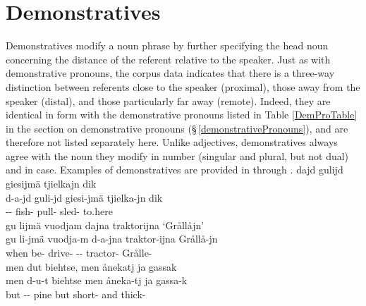 \section{Demonstratives}\label{demonstratives}
Demonstratives %
modify a noun phrase by further specifying the head noun concerning the distance of the referent relative to the speaker. Just as with demonstrative pronouns, the corpus data indicates that there is a three-way distinction between referents close to the speaker (proximal), those away from the speaker (distal), and those particularly far away (remote). 
Indeed, they are identical in form with the demonstrative pronouns listed in Table \vref{DemProTable} in the section on demonstrative pronouns (§\,\ref{demonstrativePronouns}), and are therefore not listed separately here. 
Unlike adjectives, demonstratives always agree with the noun they modify in number (singular and plural, but not dual) and in case. %
Examples of demonstratives %
are provided in  through .
\ea\label{demonstrativeAdjectivesEx1}
\glll	dajd gulijd giesijmä tjielkajn dik\\
	d-a-jd guli-jd giesi-jmä tjielka-jn dik\\
	-- fish- pull- sled- to.here\\\nopagebreak
{}	
\z
\ea\label{demonstrativeAdjectivesEx2}
\glll	gu lijmä vuodjam dajna traktorijna ‘Grållåjn’\\
	gu li-jmä vuodja-m d-a-jna traktor-ijna Grållå-jn\\
	when be- drive- -- tractor- Grålle-\\\nopagebreak
{}	
\z
\ea\label{demonstrativeAdjectivesEx3}
\glll	men dut biehtse, men ånekatj ja gassak\\
	men d-u-t biehtse men åneka-tj ja gassa-k\\
	but -- pine\BS{} but short- and thick-\\\nopagebreak
{}	
\z




